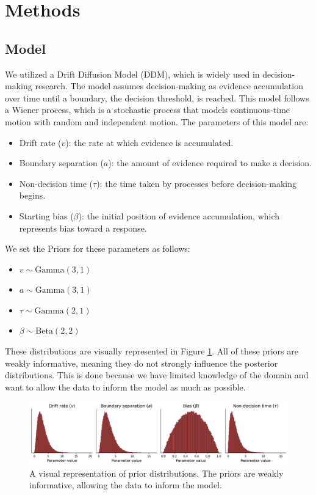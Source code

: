 \documentclass[12pt]{article}
\begin{document}
\section{Methods}
\subsection{Model}
We utilized a Drift Diffusion Model (DDM), which is widely used in decision-making research. The model assumes decision-making as evidence accumulation over time until a boundary, the decision threshold, is reached. This model follows a Wiener process, which is a stochastic process that models continuous-time motion with random and independent motion. The parameters of this model are:
\begin{itemize}
    \item Drift rate ($v$): the rate at which evidence is accumulated.
    \item Boundary separation ($a$): the amount of evidence required to make a decision.
    \item Non-decision time ($\tau$): the time taken by processes before decision-making begins.
    \item Starting bias ($\beta$): the initial position of evidence accumulation, which represents bias toward a response.
\end{itemize}
We set the Priors for these parameters as follows:
\begin{itemize}
    \item $v \sim \text{Gamma}(3, 1)$
    \item $a \sim \text{Gamma}(3, 1)$
    \item $\tau \sim \text{Gamma}(2, 1)$
    \item $\beta \sim \text{Beta}(2, 2)$
\end{itemize}
These distributions are visually represented in Figure \ref{fig:priors}. All of these priors are weakly informative, meaning they do not strongly influence the posterior distributions. This is done because we have limited knowledge of the domain and want to allow the data to inform the model as much as possible.
\begin{figure}[ht]
    \centering
    \includegraphics[scale=.45]{priors.png}
    \caption{A visual representation of prior distributions. The priors are weakly informative, allowing the data to inform the model.}
    \label{fig:priors}
\end{figure}
\end{document}
